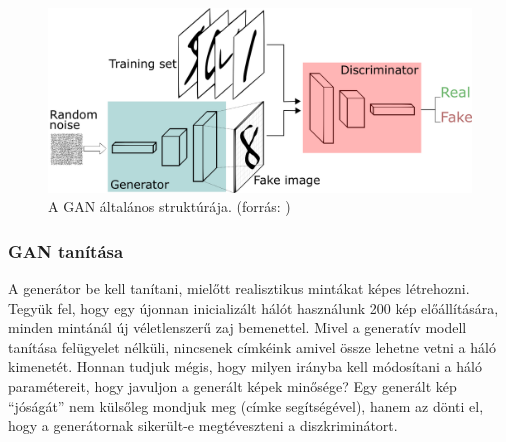 

\begin{figure}[ht]
	\centering
	\includegraphics[width=0.9\columnwidth]{figures/gan_struct.png}
	\caption{A GAN általános struktúrája. (forrás: \cite{fig:gan_struct})}
	\label{fig:gan_struct}
\end{figure}

\subsubsection{GAN tanítása}

A generátor be kell tanítani, mielőtt realisztikus mintákat képes létrehozni. Tegyük fel, hogy egy újonnan inicializált hálót használunk 200 kép előállítására, minden mintánál új véletlenszerű zaj bemenettel. Mivel a generatív modell tanítása felügyelet nélküli, nincsenek címkéink amivel össze lehetne vetni a háló kimenetét. Honnan tudjuk mégis, hogy milyen irányba kell módosítani a háló paramétereit, hogy javuljon a generált képek minősége? Egy generált kép ``jóságát'' nem külsőleg mondjuk meg (címke segítségével), hanem az dönti el, hogy a generátornak sikerült-e megtéveszteni a diszkriminátort.

